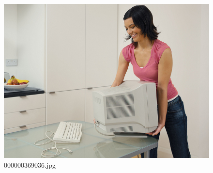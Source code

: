     \begin{figure}[h]
        \centering
        \includegraphics[width=0.8\linewidth]{../image set/easy/000000369036.jpg}
        \caption{000000369036.jpg}
    \end{figure}
